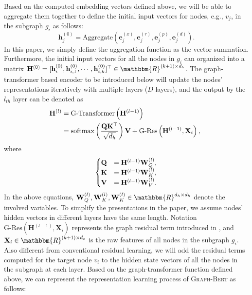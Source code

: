 \documentclass{article}
\newcommand{\mb}{\mathbf}
\newcommand{\our}{\textsc{Graph-Bert}}
\begin{document}
Based on the computed embedding vectors defined above, we will be able to aggregate them together to define the initial input vectors for nodes, e.g., $v_j$, in the subgraph $g_i$ as follows: 
\begin{equation}
\mb{h}_j^{(0)} = \mbox{Aggregate} ({\mb{e}}_{j}^{(x)}, {\mb{e}}_{j}^{(r)}, {\mb{e}}_{j}^{(p)}, {\mb{e}}_{j}^{(d)}).
\end{equation}
In this paper, we simply define the aggregation function as the vector summation. Furthermore, the initial input vectors for all the nodes in $g_i$ can organized into a matrix $\mb{H}^{(0)} = [\mb{h}_i^{(0)}, \mb{h}_{i,1}^{(0)}, \cdots, \mb{h}_{i,k}^{(0)}]^\top \in \mathbbm{R}^{(k+1) \times d_h}$. The graph-transformer based encoder to be introduced below will update the nodes' representations iteratively with multiple layers ($D$ layers), and the output by the $l_{th}$ layer can be denoted as\vspace{-4pt}
\begin{equation}
\begin{aligned}
\hspace{-5pt} \mb{H}^{(l)} &= \mbox{G-Transformer} \left( \mb{H}^{(l-1)}\right)\\
&= \mbox{softmax} \left(\frac{\mb{Q} \mb{K}^\top}{\sqrt{d_h}} \right) \mb{V} + \mbox{G-Res} \left( \mb{H}^{(l-1)}, \mb{X}_i\right),
\end{aligned}\vspace{-2pt}
\end{equation}
where
\begin{equation}
\begin{cases}
\mb{Q} & = \mb{H}^{(l-1)} \mb{W}_Q^{(l)},\\
\mb{K} & = \mb{H}^{(l-1)} \mb{W}_K^{(l)},\\
\mb{V} & = \mb{H}^{(l-1)} \mb{W}_V^{(l)}.\\
\end{cases}\vspace{-2pt}
\end{equation}
In the above equations, $\mb{W}_Q^{(l)}, \mb{W}_K^{(l)}, \mb{W}_K^{(l)} \in \mathbbm{R}^{d_h \times d_h}$ denote the involved variables. To simplify the presentations in the paper, we assume nodes' hidden vectors in different layers have the same length. Notation $\mbox{G-Res} \left( \mb{H}^{(l-1)}, \mb{X}_i\right)$ represents the graph residual term introduced in \cite{Zhang2019GResNetGR}, and $\mb{X}_i \in \mathbbm{R}^{(k+1) \times d_x}$ is the raw features of all nodes in the subgraph $g_i$. Also different from conventional residual learning, we will add the residual terms computed for the target node $v_i$ to the hidden state vectors of all the nodes in the subgraph at each layer. Based on the graph-transformer function defined above, we can represent the representation learning process of {\our} as follows:
\end{document}
